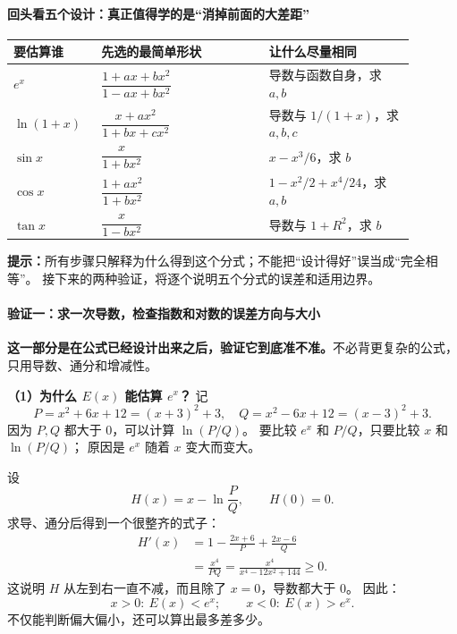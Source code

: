 \begin{proofbox}
\paragraph{回头看五个设计：真正值得学的是“消掉前面的大差距”}
\begin{center}
\begin{tabular}{p{0.18\linewidth}p{0.38\linewidth}p{0.33\linewidth}}
\hline
要估算谁 & 先选的最简单形状 & 让什么尽量相同 \\
\hline
$e^x$ & $\dfrac{1+ax+bx^2}{1-ax+bx^2}$ & 导数与函数自身，求 $a,b$ \\
$\ln(1+x)$ & $\dfrac{x+ax^2}{1+bx+cx^2}$ & 导数与 $1/(1+x)$，求 $a,b,c$ \\
$\sin x$ & $\dfrac{x}{1+bx^2}$ & $x-x^3/6$，求 $b$ \\
$\cos x$ & $\dfrac{1+ax^2}{1+bx^2}$ & $1-x^2/2+x^4/24$，求 $a,b$ \\
$\tan x$ & $\dfrac{x}{1-bx^2}$ & 导数与 $1+R^2$，求 $b$ \\
\hline
\end{tabular}
\end{center}
\textbf{提示：}所有步骤只解释为什么得到这个分式；不能把“设计得好”误当成“完全相等”。
接下来的两种验证，将逐个说明五个分式的误差和适用边界。

\medskip
\paragraph{验证一：求一次导数，检查指数和对数的误差方向与大小}
\begin{center}\end{center}

\textbf{这一部分是在公式已经设计出来之后，验证它到底准不准。}不必背更复杂的公式，只用导数、通分和增减性。

\textbf{（1）为什么 $E(x)$ 能估算 $e^x$？}
记
\[
P=x^2+6x+12=(x+3)^2+3,\quad
Q=x^2-6x+12=(x-3)^2+3.
\]
因为 $P,Q$ 都大于 $0$，可以计算 $\ln(P/Q)$。
要比较 $e^x$ 和 $P/Q$，只要比较 $x$ 和 $\ln(P/Q)$；
原因是 $e^x$ 随着 $x$ 变大而变大。

设
\[
H(x)=x-\ln\frac PQ,\qquad H(0)=0.
\]
求导、通分后得到一个很整齐的式子：
\[
\begin{aligned}
H'(x)&=1-\frac{2x+6}{P}+\frac{2x-6}{Q}\\
&=\frac{x^4}{PQ}
=\frac{x^4}{x^4-12x^2+144}\ge0.
\end{aligned}
\]
这说明 $H$ 从左到右一直不减，而且除了 $x=0$，导数都大于 $0$。
因此：
\[
\boxed{x>0:\ E(x)<e^x;\qquad x<0:\ E(x)>e^x.}
\]
不仅能判断偏大偏小，还可以算出最多差多少。


\end{proofbox}
